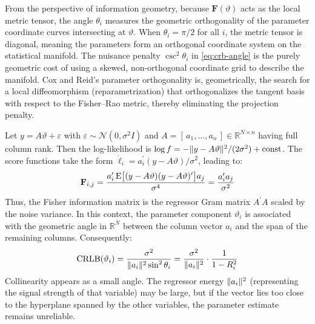 \documentclass{IEEEtran}
\begin{document}
\begin{remark}
  \label{rem:info-geometry}
  From the perspective of information geometry, because $\mathbf{F}(\vartheta)$ acts as the local metric tensor, the angle $\theta_{i}$ measures the geometric orthogonality of the parameter coordinate curves intersecting at $\vartheta$. When $\theta_{i} = \pi/2$ for all $i$, the metric tensor is diagonal, meaning the parameters form an orthogonal coordinate system on the statistical manifold. The nuisance penalty $\csc^{2}\theta_{i}$ in \eqref{eq:crb-angle} is the purely geometric cost of using a skewed, non-orthogonal coordinate grid to describe the manifold. Cox and Reid's parameter orthogonality \cite{cox1987} is, geometrically, the search for a local diffeomorphism (reparametrization) that orthogonalizes the tangent basis with respect to the Fisher--Rao metric, thereby eliminating the projection penalty.
\end{remark}

\begin{example}
  \label{ex:linear-gaussian}
  Let $y = A\vartheta + \varepsilon$ with $\varepsilon \sim \mathcal{N}(0, \sigma^{2} I)$ and $A = [\,a_{1}, \ldots, a_{n}\,] \in \mathbb{R}^{N \times n}$ having full column rank. Then the log-likelihood is $\log f = -\lVert y - A\vartheta\rVert^{2}/(2\sigma^{2}) + \mathrm{const}$. The score functions take the form $\dot{\ell}_{i} = a_{i}^{\prime} (y - A\vartheta)/\sigma^{2}$, leading to:
  \begin{equation*}
    \mathbf{F}_{i,j}
    = \frac{a_{i}^{\prime} \operatorname{E}\bigl[(y-A\vartheta)(y-A\vartheta)^{\prime}\bigr] a_{j}}
    {\sigma^{4}}
    = \frac{a_{i}^{\prime} a_{j}}{\sigma^{2}}
  \end{equation*}
  Thus, the Fisher information matrix is the regressor Gram matrix $A^{\prime} A$ scaled by the noise variance. In this context, the parameter component $\vartheta_{i}$ is associated with the geometric angle in $\mathbb{R}^{N}$ between the column vector $a_{i}$ and the span of the remaining columns. Consequently:
  \begin{equation} \label{eq:vif}
    \operatorname{CRLB}(\vartheta_{i})
    = \frac{\sigma^{2}}{\lVert a_{i}\rVert^{2} \sin^{2}\theta_{i}}
    = \frac{\sigma^{2}}{\lVert a_{i}\rVert^{2}}\cdot\frac{1}{1 - R_{i}^{2}}
  \end{equation}
  Collinearity appears as a small angle. The regressor energy $\lVert a_{i}\rVert^{2}$ (representing the signal strength of that variable) may be large, but if the vector lies too close to the hyperplane spanned by the other variables, the parameter estimate remains unreliable.
\end{example}
\end{document}
